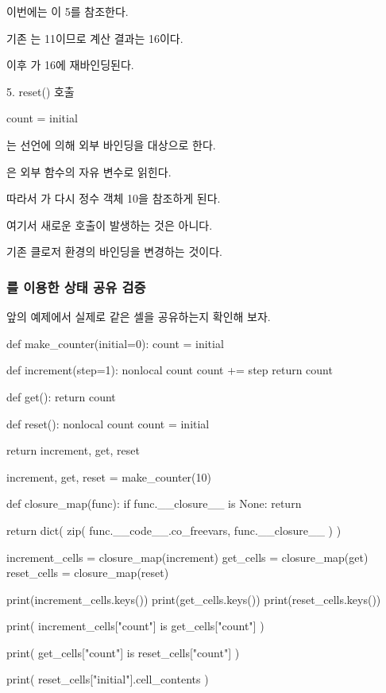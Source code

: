 이번에는 이 5를 참조한다.

기존 는 11이므로 계산 결과는 16이다.

이후 가 16에 재바인딩된다.

\begin{dhknote}
\begin{dhksmry}[centered]
5. reset() 호출
\end{dhksmry}
\end{dhknote}

\begin{dhkcode}
count = initial
\end{dhkcode}

는  선언에 의해 외부 바인딩을 대상으로 한다.

은 외부 함수의 자유 변수로 읽힌다.

따라서 가 다시 정수 객체 10을 참조하게 된다.

여기서 새로운  호출이 발생하는 것은 아니다.

기존 클로저 환경의 바인딩을 변경하는 것이다.

\subsubsection{를 이용한 상태 공유 검증}

앞의 예제에서 실제로 같은 셀을 공유하는지 확인해 보자.

\begin{dhkcode}
def make_counter(initial=0):
    count = initial

    def increment(step=1):
        nonlocal count
        count += step
        return count

    def get():
        return count

    def reset():
        nonlocal count
        count = initial

    return increment, get, reset


increment, get, reset = make_counter(10)


def closure_map(func):
    if func.__closure__ is None:
        return {}

    return dict(
        zip(
            func.__code__.co_freevars,
            func.__closure__
        )
    )


increment_cells = closure_map(increment)
get_cells = closure_map(get)
reset_cells = closure_map(reset)

print(increment_cells.keys())
print(get_cells.keys())
print(reset_cells.keys())

print(
    increment_cells["count"]
    is get_cells["count"]
)

print(
    get_cells["count"]
    is reset_cells["count"]
)

print(
    reset_cells["initial"].cell_contents
)
\end{dhkcode}


